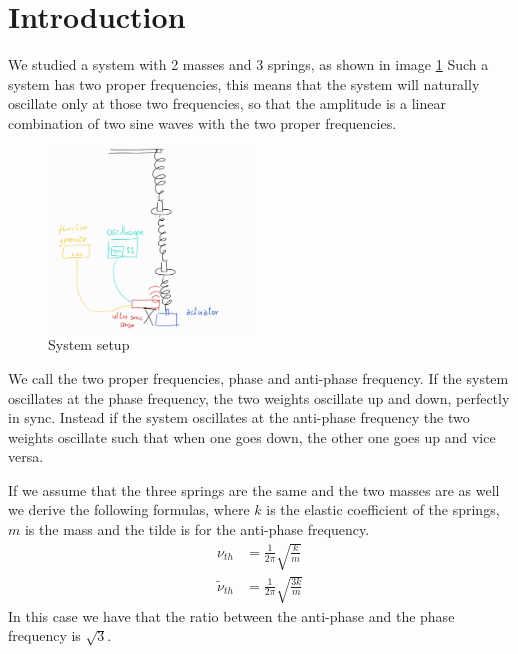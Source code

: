 \documentclass{article}
\begin{document}
\section{Introduction} \label{sec:intro}
We studied a system with 2 masses and 3 springs, as shown in image \ref{img:setup}
Such a system has two proper frequencies, this means that the system will naturally oscillate only at those two frequencies, so that the amplitude is a linear combination of two sine waves with the two proper frequencies. 


\begin{figure}
  \begin{center}
    \includegraphics[width=0.48\textwidth]{Setup}
  \end{center}
  \label{img:setup}
  \caption{System setup}
\end{figure}
We call the two proper frequencies, phase and anti-phase frequency. If the system oscillates at the phase frequency, the two weights oscillate up and down, perfectly in sync. Instead if the system oscillates at the anti-phase frequency the two weights oscillate such that when one goes down, the other one goes up and vice versa. 

If we assume that the three springs are the same and the two masses are as well 
we derive the following formulas, where $k$ is the elastic coefficient of the springs, $m$ is the mass and the tilde is for the anti-phase frequency.
\begin{align}
    \nu_{th} &= \frac{1}{2\pi}   \sqrt{\frac{ k}{m}}
        \label{eq:nuth} \\
    \tilde \nu_{th} &= \frac{1}{2\pi}   \sqrt{\frac{3k}{m}}
        \label{eq:antinuth}
\end{align}
In this case we have that the ratio between the anti-phase and the phase frequency is $\sqrt 3$.
\end{document}
